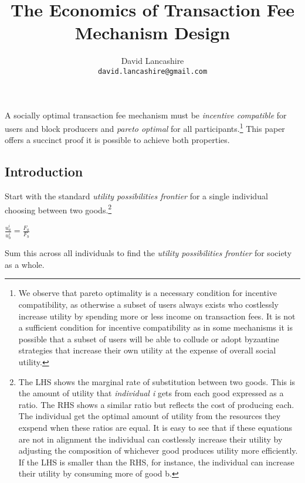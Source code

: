 \documentclass[oneside]{article}   	%
\title{The Economics of Transaction Fee Mechanism Design}
\author{
  David Lancashire\\
  \texttt{david.lancashire@gmail.com}\\
}
\begin{document}
\maketitle

\begin{onecolabstract}
A socially optimal transaction fee mechanism must be \textit{incentive compatible} for users and block producers and \textit{pareto optimal} for all participants.\footnote{We observe that pareto optimality is a necessary condition for incentive compatibility, as otherwise a subset of users always exists who costlessly increase utility by spending more or less income on transaction fees. It is not a sufficient condition for incentive compatibility as in some mechanisms it is possible that a subset of users will be able to collude or adopt byzantine strategies that increase their own utility at the expense of overall social utility.} This paper offers a succinct proof it is possible to achieve both properties.
\end{onecolabstract}
\bigskip 

\subsection*{Introduction}

Start with the standard \textit{utility possibilities frontier} for a single individual choosing between two goods.\footnote{The LHS shows the marginal rate of substitution between two goods. This is the amount of utility that \textit{individual i} gets from each good expressed as a ratio. The RHS shows a similar ratio but reflects the cost of producing each. The individual get the optimal amount of utility from the resources they exspend when these ratios are equal. It is easy to see that if these equations are not in alignment the individual can costlessly increase their utility by adjusting the composition of whichever good produces utility more efficiently. If the LHS is smaller than the RHS, for instance, the individual can increase their utility by consuming more of good b.}

\LARGE
\begin{adjustwidth}{1.5em}{1.5em} 
\begin{math}
\frac{u_a^i}{u_b^i} = \frac{F_a}{F_b}
\end{math}
\end{adjustwidth}
\normalsize

Sum this across all individuals to find the \textit{utility possibilities frontier} for society as a whole.
\end{document}
